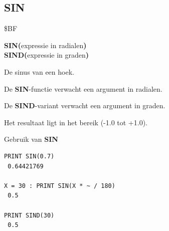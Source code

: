 \subsection{SIN}
\begin{description}[leftmargin=2cm,style=nextline]
\item [Token:]    \$BF

\item [Formaat:]   {\bf SIN(}expressie in radialen{\bf )} \\                 {\bf SIND(}expressie in graden{\bf )}

\item [Retourneert:]  De sinus van een hoek.

                  De {\bf SIN}-functie verwacht een argument in radialen.

                  De {\bf SIND}-variant verwacht een argument in graden.

                  Het resultaat ligt in het bereik (-1.0 tot +1.0).

\item [Voorbeelden:] Gebruik van {\bf SIN}

\begin{tcolorbox}[colback=black,coltext=white]
\verbatimfont{\codefont}
\begin{verbatim}
PRINT SIN(0.7)
 0.64421769

X = 30 : PRINT SIN(X * ~ / 180)
 0.5

PRINT SIND(30)
 0.5
\end{verbatim}
\end{tcolorbox}
\end{description}


\newpage
